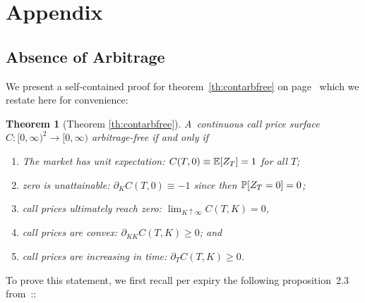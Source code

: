 \documentclass[twoside]{article}
\theoremstyle{plain}
\newtheorem{theorem}{Theorem}[section]        %
\theoremstyle{definition}
\theoremstyle{remark}
\begin{document}
\appendix

\section{Appendix}

\subsection{Absence of Arbitrage}\label{sec:appendix_absence}

We present a self-contained proof for theorem~\ref{th:contarbfree}  on page~\pageref{th:contarbfree}
which we restate here for convenience:

\begin{theorem}[Theorem \ref{th:contarbfree}]
    A~continuous call price surface $C:[0,\infty)^2 \rightarrow [0,\infty)$ \emph{arbitrage-free} 
    if and only if
    \begin{enumerate}
        \item The market has unit expectation: $C(T,0)\equiv \E[Z_T]=1$ for all $T$;
        \item zero is unattainable: $\partial_K C(T,0)\equiv -1$ since then $\P[ Z_T=0 ] =0$;  
        \item call prices ultimately reach zero: $\lim_{K\uparrow \infty} C(T,K)=0$,
        \item call prices are convex: $\partial_{KK} C(T,K) \geq 0$; and
        \item call prices are increasing in time: $\partial_T C(T,K)\geq 0$.
    \end{enumerate}
\end{theorem}

\noindent
To prove this statement, we first recall per expiry the following proposition~2.3 from~\cite{buehler2006expensive}::
\end{document}
